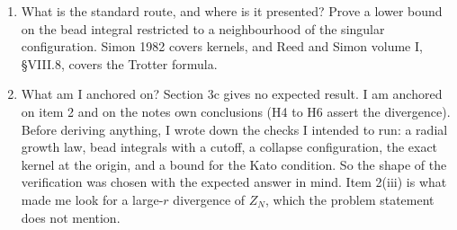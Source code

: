 \documentclass[11pt,a4paper]{article}
\providecommand{\tightlist}{\setlength{\itemsep}{0pt}\setlength{\parskip}{0pt}}
\begin{document}
\begin{enumerate}
  \begin{itemize}
  \item
    \begin{enumerate}
    \def\labelenumii{(\roman{enumii})}
    \tightlist
    \item
      Written as a bead integral, the primitive trace is \(+\infty\) for every \(N\) and every \(\Delta\tau>0\). The potential weight \(e^{\Delta\tau/r}\) is not integrable at \(r=0\) in three dimensions, and the Gaussian kinetic factors are bounded below near the singular configurations, so they cannot compensate.
    \end{enumerate}
  \item
    \begin{enumerate}
    \def\labelenumii{(\roman{enumii})}
    \setcounter{enumii}{1}
    \tightlist
    \item
      The exact kernel \(\langle\mathbf r|e^{-\tau H}|\mathbf r'\rangle\) is finite and continuous, including at the origin, because \(-1/r\) is in the Kato class (Simon\textquotesingle s 1982 review).
    \end{enumerate}
  \item
    \begin{enumerate}
    \def\labelenumii{(\roman{enumii})}
    \setcounter{enumii}{2}
    \tightlist
    \item
      For hydrogen in infinite space, the exact trace \(\operatorname{Tr}e^{-\beta H}\) is also infinite, for an unrelated reason: infinitely many bound states accumulate at zero energy, and there is a continuum.
    \end{enumerate}
  \item
    \begin{enumerate}
    \def\labelenumii{(\roman{enumii})}
    \setcounter{enumii}{3}
    \tightlist
    \item
      The imaginary-time Trotter product formula requires both summands to be bounded below, and \(-1/r\) is not.
    \end{enumerate}
  \end{itemize}
\item
  What is the standard route, and where is it presented? Prove a lower bound on the bead integral restricted to a neighbourhood of the singular configuration. Simon 1982 covers kernels, and Reed and Simon volume I, §VIII.8, covers the Trotter formula.
\item
  What am I anchored on? Section 3c gives no expected result. I am anchored on item 2 and on the notes\textquotesingle{} own conclusions (H4 to H6 assert the divergence). Before deriving anything, I wrote down the checks I intended to run: a radial growth law, bead integrals with a cutoff, a collapse configuration, the exact kernel at the origin, and a bound for the Kato condition. So the shape of the verification was chosen with the expected answer in mind. Item 2(iii) is what made me look for a large-\(r\) divergence of \(Z_N\), which the problem statement does not mention.
\end{enumerate}
\end{document}
